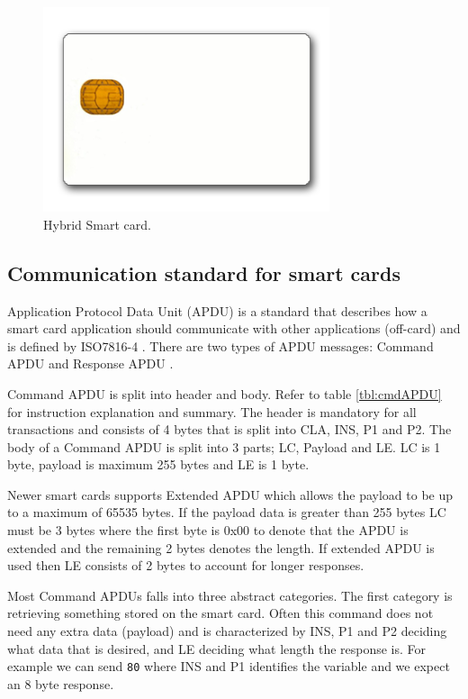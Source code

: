 \begin{figure}[h!]
  \caption{Hybrid Smart card.}
  \label{fig:nfccard}
  \centering
    \includegraphics[width=0.75\textwidth]{images/nfccard2.png}
\end{figure}

\subsection{Communication standard for smart cards}
\label{sec:communicationstandard}
Application Protocol Data Unit (APDU) is a standard that describes how a smart card application should communicate with other applications (off-card) and is defined by ISO7816-4 \cite{iso7816-4}. There are two types of APDU messages: Command APDU and Response APDU \cite[~Ch. 8.3, Message Structure: APDUS]{smartcardHandbook}.

Command APDU is split into header and body. Refer to table \ref{tbl:cmdAPDU} for instruction explanation and summary. The header is mandatory for all transactions and consists of 4 bytes that is split into CLA, INS, P1 and P2. The body of a Command APDU is split into 3 parts; LC, Payload and LE. LC is 1 byte, payload is maximum 255 bytes and LE is 1 byte.

Newer smart cards supports Extended APDU which allows the payload to be up to a maximum of 65535 bytes. If the payload data is greater than 255 bytes LC must be 3 bytes where the first byte is 0x00 to denote that the APDU is extended and the remaining 2 bytes denotes the length. If extended APDU is used then LE consists of 2 bytes to account for longer responses.


Most Command APDUs falls into three abstract categories. The first category is retrieving something stored on the smart card. Often this command does not need any extra data (payload) and is characterized by INS, P1 and P2 deciding what data that is desired, and LE deciding what length the response is. For example we can send \texttt{80} where INS and P1 identifies the variable and we expect an 8 byte response.


